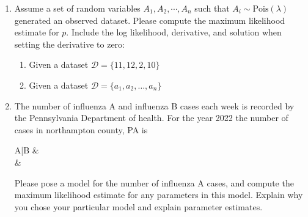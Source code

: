 \begin{enumerate}
    \item Assume a set of random variables $A_{1}, A_{2}, \cdots, A_{n}$ such that $A_{i} \sim \text{Pois}(\lambda)$ generated an observed dataset. Please compute the maximum likelihood estimate for $p$. Include the log likelihood, derivative, and solution when setting the derivative to zero: 
    \begin{enumerate}
        \item Given a dataset $\mathcal{D} = \{ 11,12,2,10 \}$
        \item Given a dataset $\mathcal{D} = \{a_{1}, a_{2}, \dots, a_{n}\}$
    \end{enumerate}
    
    \item The number of influenza A and influenza B cases each week is recorded by the Pennsylvania Department of health. 
    For the year 2022 the number of cases in northampton county, PA is 
    \begin{table}[]
        \centering
        \begin{tabular}{A|B}
             &  \\
             & 
        \end{tabular}
        \caption{Caption}
        \label{tab:my_label}
    \end{table}
    Please pose a model for the number of influenza A cases, and compute the maximum likelihood estimate for any parameters in this model. Explain why you chose your particular model and explain parameter estimates.
    
    
\end{enumerate}




